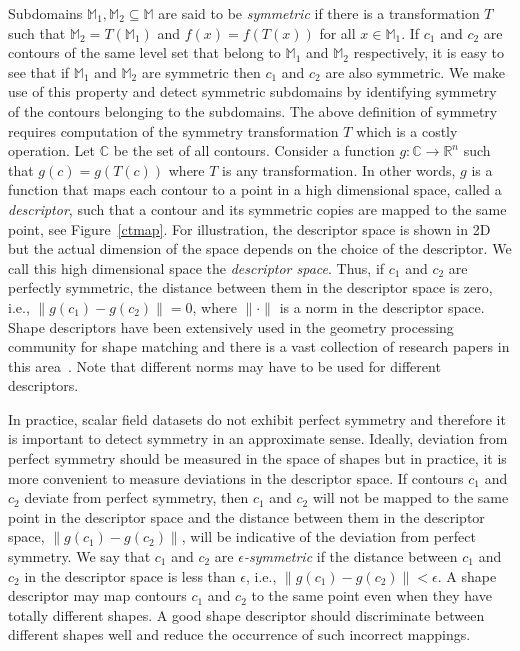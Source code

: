 \documentclass[review,journal]{vgtc}         %
\begin{document}
Subdomains $\mathbb{M}_1, \mathbb{M}_2 \subseteq \mathbb{M}$ are said to be \emph{symmetric} 
if there is a transformation $T$ such that ${\mathbb{M}_2=T(\mathbb{M}_1)}$ and 
${f(x)=f(T(x))}$ for all $x \in \mathbb{M}_1$. If $c_1$ and $c_2$ are contours of the same level
set that belong to $\mathbb{M}_1$ and $\mathbb{M}_2$ respectively, it is easy to see that if 
$\mathbb{M}_1$ and $\mathbb{M}_2$ are symmetric then $c_1$ and $c_2$ are also symmetric. 
We make use of this property and detect symmetric subdomains by identifying symmetry of the 
contours belonging to the subdomains. The above definition of symmetry requires computation of the symmetry 
transformation $T$ which is a costly operation. Let $\mathbb{C}$ be the set of all contours. 
Consider a function $g : \mathbb{C} \rightarrow \mathbb{R}^n$ such that $g(c) = g(T(c))$
where $T$ is any transformation. In other words, $g$ is a function that maps each
contour to a point in a high dimensional space, called a \emph{descriptor}, 
such that a contour and its symmetric copies are mapped to the same point, see Figure~\ref{ctmap}.
For illustration, the descriptor space is shown in 2D but the actual dimension of the space
depends on the choice of the descriptor. We call this high dimensional space the
\emph{descriptor space}. Thus, if $c_1$ and $c_2$ are perfectly symmetric,
the distance between them in the descriptor space is zero, i.e., 
$\lVert g(c_1)-g(c_2) \rVert = 0$, where $\lVert \cdot \rVert$ is a norm in
the descriptor space. Shape descriptors have been extensively used in the
geometry processing community for shape matching and there is a
vast collection of research papers in this 
area~\cite{lian2013,van2011,tangelder2008survey,qin2008content}. Note that
different norms may have to be used for different descriptors. 

In practice, scalar field datasets do not exhibit perfect symmetry and therefore
it is important to detect symmetry in an approximate sense. Ideally, deviation
from perfect symmetry should be measured in the space of shapes but in practice,
it is more convenient to measure deviations in the descriptor space. If contours $c_1$ and 
$c_2$ deviate from perfect symmetry, then $c_1$ and $c_2$ will not be mapped
to the same point in the descriptor space and the distance between
them in the descriptor space, $\lVert g(c_1)-g(c_2) \rVert$, will be indicative
of the deviation from perfect symmetry. We say that $c_1$ and $c_2$ are
\emph{$\epsilon$-symmetric} if the distance between $c_1$ and $c_2$ in the descriptor 
space is less than $\epsilon$, i.e., $\lVert g(c_1)-g(c_2) \rVert < \epsilon$.
A shape descriptor may map contours $c_1$ and $c_2$ to the same point
even when they have totally different shapes. A good shape descriptor should 
discriminate between different shapes well and reduce the occurrence of such incorrect
mappings. 
\end{document}
